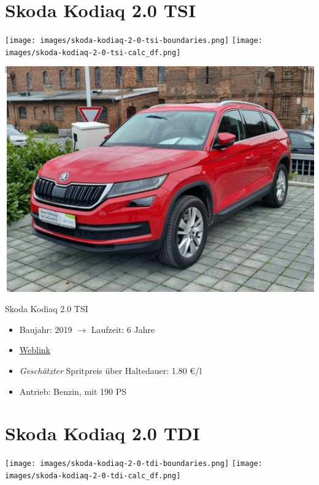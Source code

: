 \documentclass[landscape, DIV=99, 14pt]{scrartcl}
\begin{document}
\pagebreak


\twocolumn

\section*{Skoda Kodiaq 2.0 TSI}
\begin{center}
\texttt{[image: images/skoda-kodiaq-2-0-tsi-boundaries.png]}
\null
\vspace{0.5cm}
\texttt{[image: images/skoda-kodiaq-2-0-tsi-calc\_df.png]}
\end{center}

\pagebreak
\null
\vspace{2cm}
\begin{center}
\includegraphics[width=0.9\columnwidth]{cars/skoda-kodiaq-2p0-tsi.png}

Skoda Kodiaq 2.0 TSI
\end{center}

\begin{itemize}
    \item Baujahr: 2019 $\rightarrow$ Laufzeit: 6 Jahre
    \item \href{https://suchen.mobile.de/fahrzeuge/details.html?id=336695573}{Weblink}
    \item \emph{Gesch\"atzter} Spritpreis \"uber Haltedauer: 1.80 \euro{}/l
    \item Antrieb: Benzin, mit 190 PS
\end{itemize}

\pagebreak


\twocolumn

\section*{Skoda Kodiaq 2.0 TDI}
\begin{center}
\texttt{[image: images/skoda-kodiaq-2-0-tdi-boundaries.png]}
\null
\vspace{0.5cm}
\texttt{[image: images/skoda-kodiaq-2-0-tdi-calc\_df.png]}
\end{center}
\end{document}
